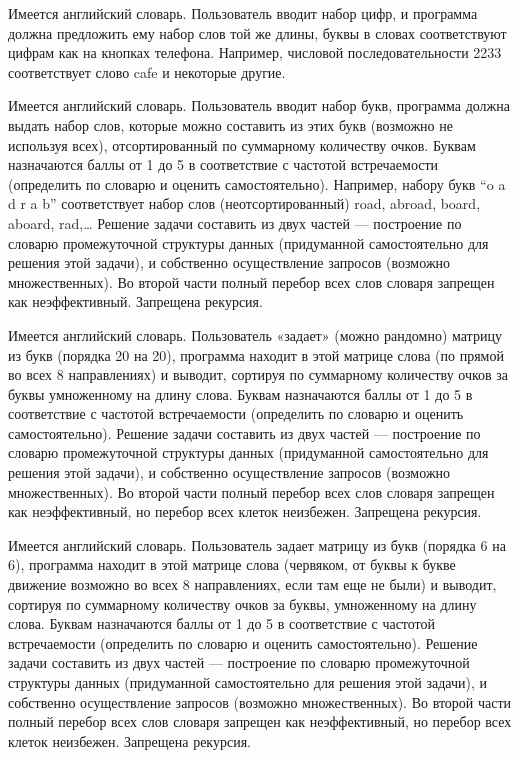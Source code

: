 
Имеется английский словарь. Пользователь вводит набор цифр, и программа должна
предложить ему набор слов той же длины, буквы в словах соответствуют цифрам
как на кнопках телефона. Например, числовой последовательности 2233
соответствует слово cafe и некоторые другие.


Имеется английский словарь. Пользователь вводит набор букв, программа должна
выдать набор слов, которые можно составить из этих букв (возможно не используя
всех), отсортированный по суммарному количеству очков. Буквам назначаются
баллы от 1 до 5 в соответствие с частотой встречаемости (определить по словарю
и оценить самостоятельно). Например, набору букв “o a d r a b” соответствует
набор слов (неотсортированный) road, abroad, board, aboard, rad,… Решение
задачи составить из двух частей — построение по словарю промежуточной
структуры данных (придуманной самостоятельно для решения этой задачи), и
собственно осуществление запросов (возможно множественных). Во второй части
полный перебор всех слов словаря запрещен как неэффективный. Запрещена
рекурсия.


Имеется английский словарь. Пользователь «задает» (можно рандомно) матрицу из
букв (порядка 20 на 20), программа находит в этой матрице слова (по прямой во
всех 8 направлениях) и выводит, сортируя по суммарному количеству очков за
буквы умноженному на длину слова. Буквам назначаются баллы от 1 до 5 в
соответствие с частотой встречаемости (определить по словарю и оценить
самостоятельно). Решение задачи составить из двух частей — построение по
словарю промежуточной структуры данных (придуманной самостоятельно для решения
этой задачи), и собственно осуществление запросов (возможно множественных). Во
второй части полный перебор всех слов словаря запрещен как неэффективный, но
перебор всех клеток неизбежен. Запрещена рекурсия.


Имеется английский словарь. Пользователь задает матрицу из букв (порядка 6 на
6), программа находит в этой матрице слова (червяком, от буквы к букве
движение возможно во всех 8 направлениях, если там еще не были) и выводит,
сортируя по суммарному количеству очков за буквы, умноженному на длину слова.
Буквам назначаются баллы от 1 до 5 в соответствие с частотой встречаемости
(определить по словарю и оценить самостоятельно). Решение задачи составить из
двух частей — построение по словарю промежуточной структуры данных
(придуманной самостоятельно для решения этой задачи), и собственно
осуществление запросов (возможно множественных). Во второй части полный
перебор всех слов словаря запрещен как неэффективный, но перебор всех клеток
неизбежен. Запрещена рекурсия.

